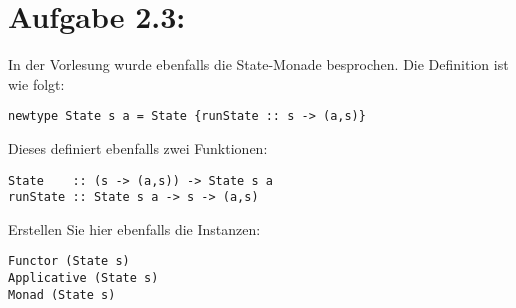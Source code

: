 \documentclass[a4paper,10pt]{scrartcl}
\newcommand{\theuebungszettel}{2}
\begin{document}
\section*{Aufgabe \theuebungszettel.3:}
In der Vorlesung wurde ebenfalls die State-Monade besprochen. Die Definition ist wie folgt:
\begin{verbatim}
newtype State s a = State {runState :: s -> (a,s)}
\end{verbatim}
Dieses definiert ebenfalls zwei Funktionen:
\begin{verbatim}
State    :: (s -> (a,s)) -> State s a
runState :: State s a -> s -> (a,s)
\end{verbatim}
Erstellen Sie hier ebenfalls die Instanzen:
\begin{verbatim}
Functor (State s)
Applicative (State s)
Monad (State s)
\end{verbatim}
\end{document}
